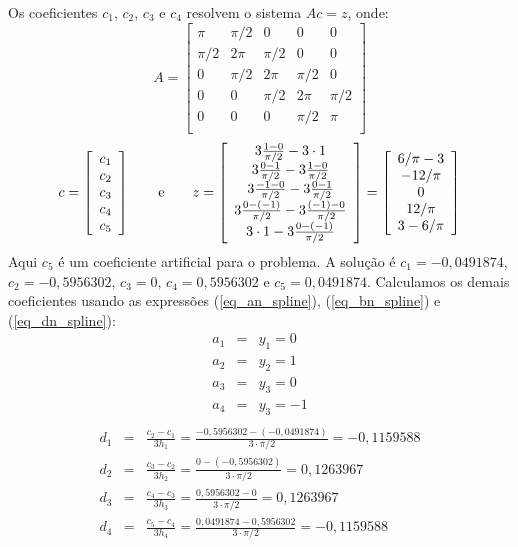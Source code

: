 \documentclass[main.tex]{subfiles}
\begin{document}
Os coeficientes $c_1$, $c_2$, $c_3$ e $c_4$ resolvem o sistema $Ac = z$, onde:
\begin{equation*}
A=\left[\begin{array}{ccccc}
\pi &\pi/2&0&0&0 \\
\pi/2&2\pi&\pi/2&0&0\\
0&\pi/2&2\pi&\pi/2&0\\
0&0&\pi/2&2\pi&\pi/2\\
0&0&0&\pi/2&\pi\\
\end{array}\right]  
\end{equation*}
\begin{equation*}
c = \left[\begin{array}{c}
c_1\\
c_2\\
c_3\\
c_4\\
c_5
\end{array}\right]\qquad \hbox{e}\qquad
z = \left[\begin{array}{c}
3\frac{1-0}{\pi/2}-3\cdot 1\\
3\frac{0-1}{\pi/2}-3\frac{1-0}{\pi/2}\\
3\frac{-1-0}{\pi/2}-3\frac{0-1}{\pi/2}\\
3\frac{0-(-1)}{\pi/2}-3\frac{(-1)-0}{\pi/2}\\
3\cdot 1-3\frac{0-(-1)}{\pi/2}
\end{array}\right]=\left[\begin{array}{c}
6/\pi-3\\
-12/\pi\\
0\\
12/\pi\\
3-6/\pi
\end{array}\right]  
\end{equation*}
Aqui $c_5$ é um coeficiente artificial para o problema. A solução é  $c_1=-0,0491874$, $c_2=-0,5956302$, $c_3=0$, $c_4=0,5956302$ e $c_5=0,0491874$. Calculamos os demais coeficientes usando as expressões (\ref{eq_an_spline}), (\ref{eq_bn_spline}) e (\ref{eq_dn_spline}):
\begin{eqnarray*}
a_1&=&y_1=0\\
a_2&=&y_2=1\\
a_3&=&y_3=0\\
a_4&=&y_3=-1\\
\end{eqnarray*}
\begin{eqnarray*}
d_1&=&\frac{c_{2}-c_1}{3h_1}=\frac{-0,5956302-(-0,0491874)}{3\cdot \pi/2}=-0,1159588\\
d_2&=&\frac{c_{3}-c_2}{3h_2}=\frac{0-(-0,5956302)}{3\cdot \pi/2}=0,1263967\\
d_3&=&\frac{c_{4}-c_3}{3h_3}=\frac{0,5956302- 0}{3\cdot \pi/2}=0,1263967\\
d_4&=&\frac{c_{5}-c_4}{3h_4}=\frac{0,0491874- 0,5956302}{3\cdot \pi/2}=-0,1159588
\end{eqnarray*}
\end{document}
